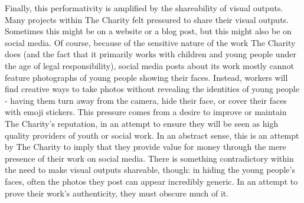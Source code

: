 Finally, this performativity is amplified by the shareability of visual outputs. Many projects within The Charity felt pressured to share their visual outputs. Sometimes this might be on a website or a blog post, but this might also be on social media. Of course, because of the sensitive nature of the work The Charity does (and the fact that it primarily works with children and young people under the age of legal responsibility), social media posts about its work mostly cannot feature photographs of young people showing their faces. Instead, workers will find creative ways to take photos without revealing the identities of young people - having them turn away from the camera, hide their face, or cover their faces with emoji stickers. This pressure comes from a desire to improve or maintain The Charity's reputation, in an attempt to ensure they will be seen as high quality providers of youth or social work. In an abstract sense, this is an attempt by The Charity to imply that they provide value for money through the mere presence of their work on social media. There is something contradictory within the need to make visual outputs shareable, though: in hiding the young people's faces, often the photos they post can appear incredibly generic. In an attempt to prove their work's authenticity, they must obscure much of it.

